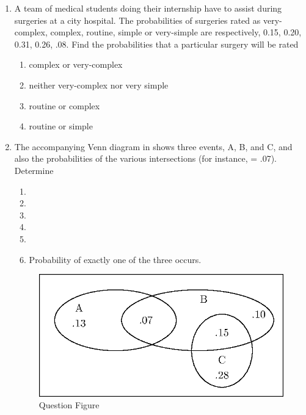 \begin{enumerate}[label=\thesection.\arabic*,ref=\thesection.\theenumi]
	\item A team of medical students doing their internship have to assist during surgeries
at a city hospital. The probabilities of surgeries rated as very-complex, complex,
routine, simple or very-simple are respectively, 0.15, 0.20, 0.31, 0.26, .08. Find
the probabilities that a particular surgery will be rated
\begin{enumerate}
\item complex or very-complex
\item neither very-complex nor very simple
\item routine or complex
\item routine or simple
\end{enumerate}
		\solution
		
	\item The accompanying Venn diagram in 
		shows three events, A, B, and C, and also the probabilities of the various intersections (for instance,  = .07). Determine
\begin{enumerate}
\item 
{}
\item 
{}
\item 
{}
\item 
{}
\item 
{}
\item 
Probability of exactly one
of the three occurs.
\end{enumerate}
\begin{figure}[h!]
	\centering
	\includegraphics[width = \columnwidth]{exemplar/11/16/3/11/figs/new-figure0}
\caption{Question Figure}
\label{fig:exemplar/11/16/3/11/Venn_Diagram}
\end{figure}
		\solution
		
\end{enumerate}
